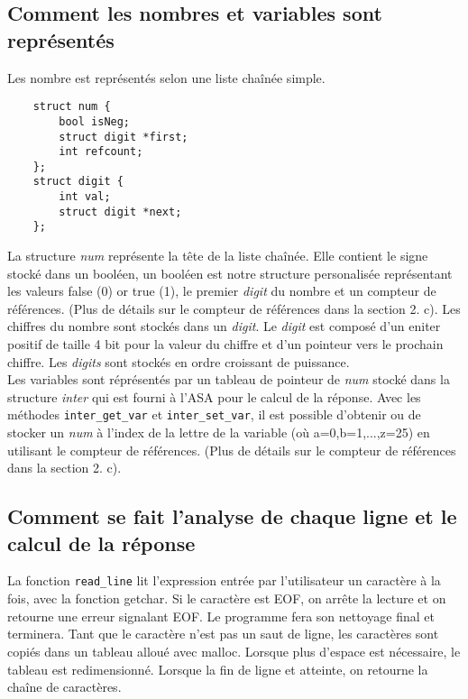 \documentclass[a4paper,12pt,french]{article}
\begin{document}
	\subsection{Comment les nombres et variables sont représentés}
		Les nombre est représentés selon une liste chaînée simple.
\begin{lstlisting}
	struct num {
	    bool isNeg;
	    struct digit *first;
	    int refcount;
	};
	struct digit {
	    int val;
	    struct digit *next;
	};
\end{lstlisting}
		La structure \textit{num} représente la tête de la liste chaînée. Elle contient le signe stocké dans un booléen, un booléen est notre structure personalisée représentant les valeurs \og false \fg{}(0) or \og true \fg{}(1), le premier \textit{digit} du nombre et un compteur de références. (Plus de détails sur le compteur de références dans la section 2. c). Les chiffres du nombre sont stockés dans un \textit{digit}. Le \textit{digit} est composé d'un eniter positif de taille 4 bit pour la valeur du chiffre et d'un pointeur vers le prochain chiffre. Les \textit{digits} sont stockés en ordre croissant de puissance.\\

		Les variables sont réprésentés par un tableau de pointeur de \textit{num} stocké dans la structure \textit{inter} qui est fourni à l'ASA pour le calcul de la réponse. Avec les méthodes \lstinline$inter_get_var$ et \lstinline$inter_set_var$, il est possible d'obtenir ou de stocker un \textit{num} à l'index de la lettre de la variable (où a=0,b=1,...,z=25)  en utilisant le compteur de références. (Plus de détails sur le compteur de références dans la section 2. c).

	\subsection{Comment se fait l’analyse de chaque ligne et le calcul de la réponse}
		La fonction \lstinline$read_line$ lit l'expression entrée par l'utilisateur un caractère à la fois,
		avec la fonction getchar. Si le caractère est EOF, on arrête la lecture et on retourne
		une erreur signalant EOF. Le programme fera son nettoyage final et terminera. Tant que
		le caractère n'est pas un saut de ligne, les caractères sont copiés dans un tableau
		alloué avec malloc. Lorsque plus d'espace est nécessaire, le tableau est redimensionné.
		Lorsque la fin de ligne et atteinte, on retourne la chaîne de caractères.\\
\end{document}
